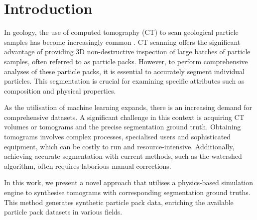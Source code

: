 \documentclass[preprint,12pt]{elsarticle}
\begin{document}

\section{Introduction} \label{sec:introduction}
In geology, the use of computed tomography (CT) to scan geological particle samples has become increasingly common \cite{VANGEET200025, cnudde20123d, warlo2021multi}.
CT scanning offers the significant advantage of providing 3D non-destructive inspection of large batches of particle samples, often referred to as particle packs.
However, to perform comprehensive analyses of these particle packs, it is essential to accurately segment individual particles. 
This segmentation is crucial for examining specific attributes such as composition and physical properties.

As the utilisation of machine learning expands, there is an increasing demand for comprehensive datasets.
A significant challenge in this context is acquiring CT volumes or tomograms and the precise segmentation ground truth.
Obtaining tomograms involves complex processes, specialised users and sophisticated equipment, which can be costly to run and resource-intensive. 
Additionally, achieving accurate segmentation with current methods, such as the watershed algorithm, often requires laborious manual corrections.

In this work, we present a novel approach that utilises a physics-based simulation engine to synthesise tomograms with corresponding segmentation ground truths. 
This method generates synthetic particle pack data, enriching the available particle pack datasets in various fields.


\end{document}
